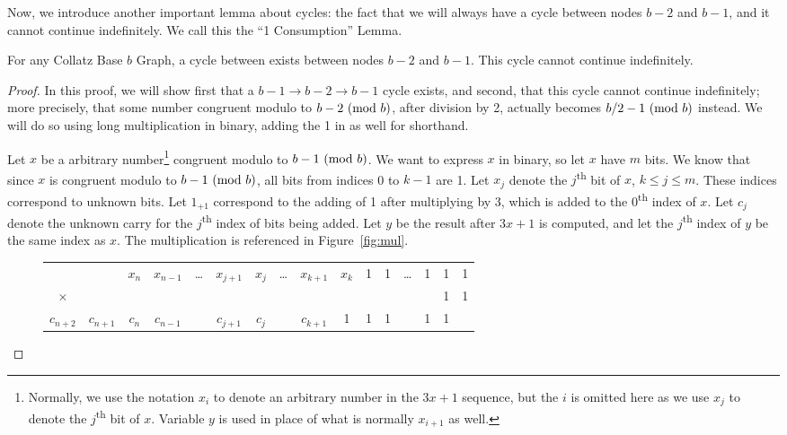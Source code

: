 Now, we introduce another important lemma about cycles: the fact that we will always have a cycle between nodes $b-2$ and $b-1$, and it cannot continue indefinitely. We call this the ``1 Consumption'' Lemma.
\begin{lemma}
\label{lem:oneConsumption}
 For any Collatz Base $b$ Graph, a cycle between exists between nodes $b-2$ and $b-1$. This cycle cannot continue indefinitely.
\end{lemma}
\begin{proof}
In this proof, we will show first that a $b-1 \rightarrow b-2 \rightarrow b-1$ cycle exists, and second, that this cycle cannot continue indefinitely; more precisely, that some number congruent modulo to $b-2 \ (\mathrm{mod}\ b)$, after division by 2, actually becomes $b/2-1 \ (\mathrm{mod}\ b)$ instead. We will do so using long multiplication in binary, adding the 1 in as well for shorthand. \par
Let $x$ be a arbitrary number\footnote{Normally, we use the notation $x_i$ to denote an arbitrary number in the $3x+1$ sequence, but the $i$ is omitted here as we use $x_j$ to denote the $j$\textsuperscript{th} bit of $x$. Variable $y$ is used in place of what is normally $x_{i+1}$ as well. } congruent modulo to $b-1 \ (\mathrm{mod}\ b)$. We want to express $x$ in binary, so let $x$ have $m$ bits. We know that since $x$ is congruent modulo to $b-1 \ (\mathrm{mod}\ b)$, all bits from indices 0 to $k-1$ are 1. Let $x_j$ denote the $j$\textsuperscript{th} bit of $x$, $k \leq j \leq m$. These indices correspond to unknown bits. Let $1_{+1}$ correspond to the adding of 1 after multiplying by 3, which is added to the 0\textsuperscript{th} index of $x$. Let $c_j$ denote the unknown carry for the $j$\textsuperscript{th} index of bits being added. Let $y$ be the result after $3x+1$ is computed, and let the $j$\textsuperscript{th} index of $y$ be the same index as $x$. The multiplication is referenced in Figure~\ref{fig:mul}. \par
\begin{figure}
\begin{tabular}{*{16}c}%
 & & $ x_{n}$  & $ x_{n-1}$  & \ldots & $ x_{j+1}$  & $ x_{j}$  & \ldots & $ x_{k+1}$  & $ x_{k}$  & 1 & 1 & \ldots & 1 & 1 & 1 \\
$\times$ & & & & & & & & & & & & & & 1 & 1 \\
\hline
\tiny ${\scriptscriptstyle c_{n+2}}$ & ${\scriptscriptstyle c_{n+1}}$ & ${\scriptscriptstyle c_{n}}$ & ${\scriptscriptstyle c_{n-1}}$ & & ${\scriptscriptstyle c_{j+1}}$ & ${\scriptscriptstyle c_{j}}$ & & ${\scriptscriptstyle c_{k+1}}$ & \tiny 1 & \tiny 1 &  \tiny 1 & &  \tiny 1 & \tiny 1 & \\

\end{tabular}
\end{figure}
\end{proof}
